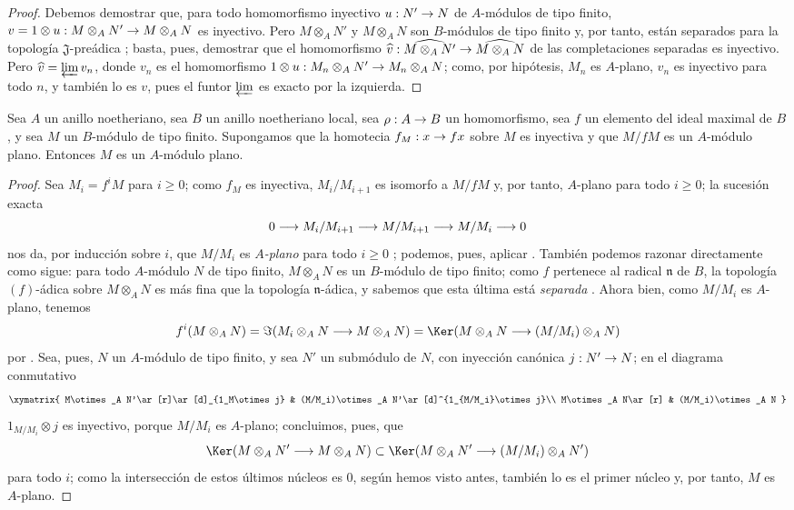 \documentclass[oneside]{amsart}
\makeatletter
\renewcommand{\geq}{\geqslant}
\newcommand{\ega@arrow}[2]{\mathchoice{#1}{#2}{#2}{#2}}
\renewcommand{\to}{\ega@arrow{\longrightarrow}{\rightarrow}}
\newcommand{\oldpage}[2][]{{\marginnote{\normalfont\textbf{#1}~|~#2}}\ignorespaces}
\let\EGAOriginalLabel\label
\renewcommand{\label}[1]{\phantomsection\EGAOriginalLabel{#1}}
\makeatother
\begin{document}
\begin{proof}
Debemos demostrar que, para todo homomorfismo inyectivo $u:N'\to N$ de $A$-módulos de tipo finito, $v=1\otimes u:M\otimes_A N'\to M\otimes_A N$ es inyectivo.
Pero $M\otimes_A N'$ y $M\otimes_A N$ son $B$-módulos de tipo finito y, por tanto, están separados para la topología $\mathfrak{J}$-preádica ;
basta, pues, demostrar que el homomorfismo $\widehat{v}:\widehat{M\otimes_A N'}\to\widehat{M\otimes_A N}$ de las completaciones separadas es inyectivo.
Pero $\widehat{v}=\varprojlim v_n$, donde $v_n$ es el homomorfismo $1\otimes u:M_n\otimes_A N'\to M_n\otimes_A N$;
como, por hipótesis, $M_n$ es $A$-plano, $v_n$ es inyectivo para todo $n$, y también lo es $v$, pues el funtor $\varprojlim$ es exacto por la izquierda.
\end{proof}

\begin{corollary}[10.2.7]
\label{0.10.2.7}
Sea $A$ un anillo noetheriano, sea $B$ un anillo noetheriano local, sea $\rho:A\to B$ un homomorfismo, sea $f$ un elemento del ideal maximal de $B$, y sea $M$ un $B$-módulo de tipo finito.
Supongamos que la homotecia $f_M:x\to fx$ sobre $M$ es inyectiva y que $M/fM$ es un $A$-módulo plano.
Entonces $M$ es un $A$-módulo plano.
\end{corollary}

\begin{proof}
Sea $M_i=f^iM$ para $i\geq0$;
como $f_M$ es inyectiva, $M_i/M_{i+1}$ es isomorfo a $M/fM$ y, por tanto, $A$-plano para todo $i\geq0$;
la sucesión exacta
\[
  0\to M_i/M_{i+1}\to M/M_{i+1}\to M/M_i\to 0
\]
nos da, por inducción sobre $i$, que $M/M_i$ es \emph{$A$-plano} para todo $i\geq0$ ;
podemos, pues, aplicar .
También podemos razonar directamente como sigue:
para todo $A$-módulo $N$ de tipo finito, $M\otimes_A N$ es un $B$-módulo de tipo finito;
como $f$ pertenece al radical $\mathfrak{n}$ de $B$, la topología $(f)$-ádica sobre $M\otimes_A N$ es más fina que la topología
\oldpage[0\textsubscript{III-1}]{20}
$\mathfrak{n}$-ádica, y sabemos que esta última está \emph{separada} .
Ahora bien, como $M/M_i$ es $A$-plano, tenemos
\[
  f^i(M\otimes_A N)=\Im(M_i\otimes_A N\to M\otimes_A N)=\Ker(M\otimes_A N\to(M/M_i)\otimes_A N)
\]
por .
Sea, pues, $N$ un $A$-módulo de tipo finito, y sea $N'$ un submódulo de $N$, con inyección canónica $j:N'\to N$; en el diagrama conmutativo
\[
  \xymatrix{
    M\otimes_A N'\ar[r]\ar[d]_{1_M\otimes j} &
    (M/M_i)\otimes_A N'\ar[d]^{1_{M/M_i}\otimes j}\\
    M\otimes_A N\ar[r] &
    (M/M_i)\otimes_A N
  }
\]
$1_{M/M_i}\otimes j$ es inyectivo, porque $M/M_i$ es $A$-plano; concluimos, pues, que
\[
  \Ker(M\otimes_A N'\to M\otimes_A N)\subset\Ker(M\otimes_A N'\to(M/M_i)\otimes_A N')
\]
para todo $i$; como la intersección de estos últimos núcleos es $0$, según hemos visto antes, también lo es el primer núcleo y, por tanto, $M$ es $A$-plano.
\end{proof}
\end{document}
